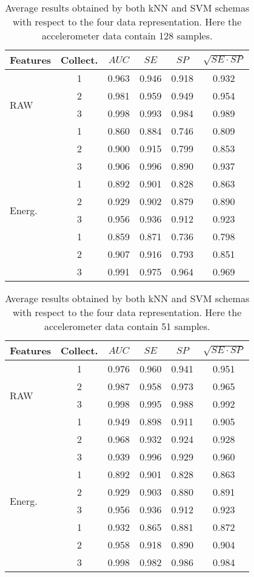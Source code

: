 \documentclass[twocolumn]{svjour3}          \smartqed  \usepackage[draft]{hyperref}
\begin{document}
 
 \begin{table}[tb]
\scriptsize
\centering
\begin{tabular}{lccccc}
	Features&Collect.	&	$AUC$ &	$SE$ &	$SP$	&	$\sqrt{SE\cdot SP}$ \\
\hline \multirow{4}{*}{RAW}	&1&	0.963&	0.946&	0.918&	0.932\\ 
&2&	0.981&	0.959&	0.949&	0.954\\ 
&3&	0.998&	0.993&	0.984&	0.989\\ 
[2pt] 
\hline 
\multirow{4}{*}{Magn.}	&1&	0.860&	0.884&	0.746&	0.809\\ 
&2&	0.900&	0.915&	0.799&	0.853\\ 
&3&	0.906&	0.996&	0.890&	0.937\\ 
[2pt] 
\hline 
\multirow{4}{*}{Energ.}	&1&	0.892&	0.901&	0.828&	0.863\\ 
&2&	0.929&	0.902&	0.879&	0.890\\ 
&3&	0.956&	0.936&	0.912&	0.923\\ 
[2pt] 
\hline 
\multirow{4}{*}{LTP}	&1&	0.859&	0.871&	0.736&	0.798\\ 
&2&	0.907&	0.916&	0.793&	0.851\\ 
&3&	0.991&	0.975&	0.964&	0.969\\ 
[2pt] 
\hline 
\end{tabular}
\medskip
\caption{Average results obtained by both kNN and SVM schemas with respect to the four data representation. Here the accelerometer data contain 128 samples.}
\label{table:summary-2-128}
 \end{table}
 

 \begin{table}[tb]
\scriptsize
\centering
\begin{tabular}{lccccc}
	Features&Collect.	&	$AUC$ &	$SE$ &	$SP$	&	$\sqrt{SE\cdot SP}$ \\
\hline \multirow{4}{*}{RAW}	&1&	0.976&	0.960&	0.941&	0.951\\ 
&2&	0.987&	0.958&	0.973&	0.965\\ 
&3&	0.998&	0.995&	0.988&	0.992\\ 
[2pt] 
\hline 
\multirow{4}{*}{Magn.}	&1&	0.949&	0.898&	0.911&	0.905\\ 
&2&	0.968&	0.932&	0.924&	0.928\\ 
&3&	0.939&	0.996&	0.929&	0.960\\ 
[2pt] 
\hline 
\multirow{4}{*}{Energ.}	&1&	0.892&	0.901&	0.828&	0.863\\ 
&2&	0.929&	0.903&	0.880&	0.891\\ 
&3&	0.956&	0.936&	0.912&	0.923\\ 
[2pt] 
\hline 
\multirow{4}{*}{LTP}	&1&	0.932&	0.865&	0.881&	0.872\\ 
&2&	0.958&	0.918&	0.890&	0.904\\ 
&3&	0.998&	0.982&	0.986&	0.984\\ 
[2pt] 
\hline 
\end{tabular}
\medskip
\caption{Average results obtained by both kNN and SVM schemas with respect to the four data representation. Here the accelerometer data contain 51 samples.}
\label{table:summary-2-51}
 \end{table}
 
\end{document}

